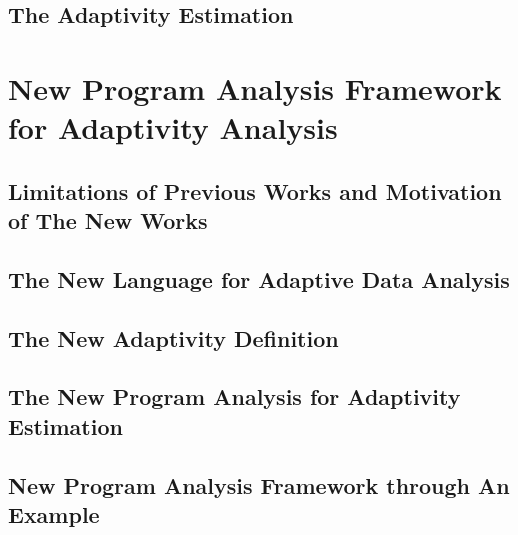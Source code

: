 \documentclass[a4paper,11pt]{article}
\begin{document}
\subsection{The Adaptivity Estimation}
\label{sec:prework-static}


\section{New Program Analysis Framework for Adaptivity Analysis}
\label{sec:adapt-analysis}
% 
\subsection{Limitations of Previous Works and Motivation of The New Works}
\label{sec:prework-limitation}


\subsection{The New Language for Adaptive Data Analysis}
\label{sec:adapt-language}



\subsection{The New Adaptivity Definition}
\label{sec:adapt-exe}

% 

\subsection{The New Program Analysis for Adaptivity Estimation}
\label{sec:adapt-static}


\subsection{New Program Analysis Framework through An Example}
\label{sec:adapt-example}

\end{document}
